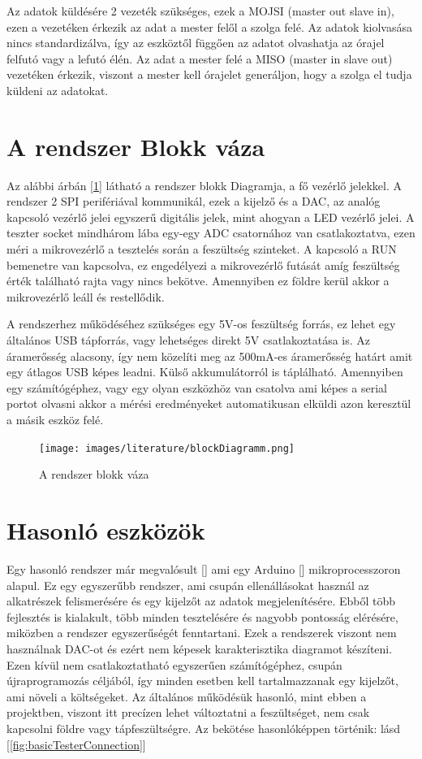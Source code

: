 Az adatok küldésére 2 vezeték szükséges, ezek a MOJSI (master out slave in), ezen a
vezetéken érkezik az adat a mester felől a szolga felé. Az adatok kiolvasása nincs
standardizálva, így az eszköztől függően az adatot olvashatja az órajel felfutó vagy a 
lefutó élén. Az adat a mester felé a MISO (master in slave out) vezetéken érkezik,
viszont a mester kell órajelet generáljon, hogy a szolga el tudja küldeni az adatokat.

\section{A rendszer Blokk váza}

Az alábbi árbán [\ref{fig:blockDiagramm}] látható a rendszer blokk Diagramja, a fő vezérlő jelekkel.
A rendszer 2 SPI perifériával kommunikál, ezek a kijelző és a DAC, az analóg kapcsoló vezérlő jelei 
egyszerű digitális jelek, mint ahogyan a LED vezérlő jelei. A teszter socket mindhárom lába egy-egy ADC
csatornához van csatlakoztatva, ezen méri a mikrovezérlő a tesztelés során a feszültség szinteket.
A kapcsoló a RUN bemenetre van kapcsolva, ez engedélyezi a mikrovezérlő futását amíg feszültség érték 
található rajta vagy nincs bekötve. Amennyiben ez földre kerül akkor a mikrovezérlő leáll és restellődik.

A rendszerhez működéséhez szükséges egy 5V-os feszültség forrás, ez lehet egy általános USB
tápforrás, vagy lehetséges direkt 5V csatlakoztatása is. Az áramerősség alacsony, így nem közelíti
meg az 500mA-es áramerősség határt amit egy átlagos USB képes leadni. Külső akkumulátorról
is táplálható. Amennyiben egy számítógéphez, vagy egy olyan eszközhöz van csatolva ami képes 
a serial portot olvasni akkor a mérési eredményeket automatikusan elküldi azon keresztül a 
másik eszköz felé. 


\begin{figure}[h]
    \centering
    \texttt{[image: images/literature/blockDiagramm.png]}
    \caption{A rendszer blokk váza}
    \label{fig:blockDiagramm}
\end{figure}


\section{Hasonló eszközök}

Egy hasonló rendszer már megvalósult [\cite{similarSystem}] ami egy Arduino 
[\cite{ArduinoAtmega}] 
mikroprocesszoron alapul. Ez egy egyszerűbb rendszer, ami csupán ellenállásokat használ az 
alkatrészek felismerésére és egy kijelzőt az adatok megjelenítésére. Ebből több fejlesztés is 
kialakult, több minden tesztelésére és nagyobb pontosság elérésére, miközben a rendszer 
egyszerűségét fenntartani. Ezek a rendszerek viszont nem használnak DAC-ot és ezért nem képesek 
karakterisztika diagramot készíteni. Ezen kívül nem csatlakoztatható egyszerűen számítógéphez, 
csupán újraprogramozás céljából, így minden esetben kell tartalmazzanak egy kijelzőt, ami 
növeli a költségeket. Az általános működésük hasonló, mint ebben a projektben, viszont itt 
precízen lehet változtatni a feszültséget, nem csak kapcsolni földre vagy tápfeszültségre.
Az bekötése hasonlóképpen történik: lásd [\ref{fig:basicTesterConnection}]


